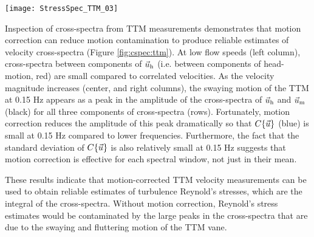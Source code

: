 \begin{figure*}[t]
  \centering
  \texttt{[image: StressSpec\_TTM\_03]}
  \caption{The real part of the cross-spectral density between velocity components measured by the TTM. The upper-row is the $u$-$v$ cross-spectral density, the middle-row is the $u$-$w$ cross-spectral density, and the bottom-row is the $v$-$w$ cross-spectral density.  The columns are for different ranges of the stream-wise mean velocity magnitude (indicated above the top row). The blue line is the cross-spectrum between components of motion-corrected velocity, the red line is the cross-spectrum between components of head-motion, and the black line is the cross-spectrum between components of uncorrected velocity. The light-blue shading indicates one standard deviation of the $C$ for the motion corrected cross-spectral density. N is the number of spectral ensembles in each column. The number in the lower right corner of each panel is the motion-corrected Reynold's stress (integral of the blue line) in units of 1e-4 $\mathrm{m^2s^{-2}}$.}
  \label{fig:cspec:ttm}
\end{figure*}

Inspection of cross-spectra from TTM measurements demonstrates that motion correction can reduce motion contamination to produce reliable estimates of velocity cross-spectra (Figure \ref{fig:cspec:ttm}). At low flow speeds (left column), cross-spectra between components of $\vec{u}_\mathrm{h}$ (i.e. between components of head-motion, red) are small compared to correlated velocities. As the velocity magnitude increases (center, and right columns), the swaying motion of the TTM at 0.15 Hz appears as a peak in the amplitude of the cross-spectra of $\vec{u}_\mathrm{h}$ and $\vec{u}_\mathrm{m}$ (black) for all three components of cross-spectra (rows). Fortunately, motion correction reduces the amplitude of this peak dramatically so that $C\{\vec{u}\}$ (blue) is small at 0.15 Hz compared to lower frequencies. Furthermore, the fact that the standard deviation of $C\{\vec{u}\}$ is also relatively small at 0.15 Hz suggests that motion correction is effective for each spectral window, not just in their mean.

These results indicate that motion-corrected TTM velocity measurements can be used to obtain reliable estimates of turbulence Reynold's stresses, which are the integral of the cross-spectra. Without motion correction, Reynold's stress estimates would be contaminated by the large peaks in the cross-spectra that are due to the swaying and fluttering motion of the TTM vane.

